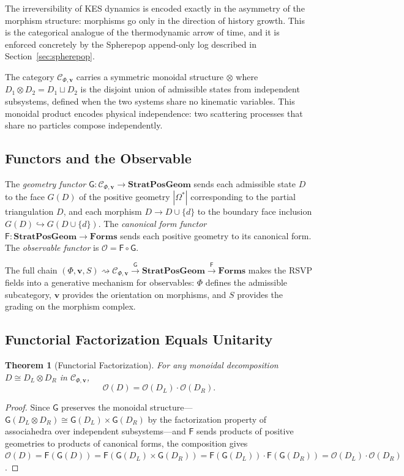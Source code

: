 \documentclass[12pt, oneside]{amsart}
\theoremstyle{plain}
\newtheorem{theorem}{Theorem}[section]
\theoremstyle{definition}
\theoremstyle{remark}
\newcommand{\Phif}{\Phi}
\newcommand{\Sf}{S}
\newcommand{\OmKS}{\Omega}
\newcommand{\SPG}{\mathbf{StratPosGeom}}
\newcommand{\Forms}{\mathbf{Forms}}
\newcommand{\Ccat}{\mathcal{C}_{\Phi,\mathbf{v}}}
\newcommand{\Gfun}{\mathsf{G}}
\newcommand{\Ffun}{\mathsf{F}}
\newcommand{\Ofun}{\mathcal{O}}
\begin{document}
The irreversibility of KES dynamics is encoded exactly in the asymmetry of the morphism structure: morphisms go only in the direction of history growth. This is the categorical analogue of the thermodynamic arrow of time, and it is enforced concretely by the Spherepop append-only log described in Section~\ref{sec:spherepop}.

The category $\Ccat$ carries a symmetric monoidal structure $\otimes$ where $D_1 \otimes D_2 = D_1 \sqcup D_2$ is the disjoint union of admissible states from independent subsystems, defined when the two systems share no kinematic variables. This monoidal product encodes physical independence: two scattering processes that share no particles compose independently.

\subsection{Functors and the Observable}

The \emph{geometry functor} $\Gfun: \Ccat \to \SPG$ sends each admissible state $D$ to the face $G(D)$ of the positive geometry $|\OmKS^*|$ corresponding to the partial triangulation $D$, and each morphism $D \to D \cup \{d\}$ to the boundary face inclusion $G(D) \hookrightarrow G(D \cup \{d\})$. The \emph{canonical form functor} $\Ffun: \SPG \to \Forms$ sends each positive geometry to its canonical form. The \emph{observable functor} is $\Ofun = \Ffun \circ \Gfun$.

The full chain $(\Phif, \mathbf{v}, \Sf) \rightsquigarrow \Ccat \xrightarrow{\Gfun} \SPG \xrightarrow{\Ffun} \Forms$ makes the RSVP fields into a generative mechanism for observables: $\Phif$ defines the admissible subcategory, $\mathbf{v}$ provides the orientation on morphisms, and $\Sf$ provides the grading on the morphism complex.

\subsection{Functorial Factorization Equals Unitarity}

\begin{theorem}[Functorial Factorization]
\label{thm:factorization}
For any monoidal decomposition $D \cong D_L \otimes D_R$ in $\Ccat$,
\[
  \Ofun(D) = \Ofun(D_L) \cdot \Ofun(D_R).
\]
\end{theorem}

\begin{proof}
Since $\Gfun$ preserves the monoidal structure---$\Gfun(D_L \otimes D_R) \cong \Gfun(D_L) \times \Gfun(D_R)$ by the factorization property of associahedra over independent subsystems---and $\Ffun$ sends products of positive geometries to products of canonical forms, the composition gives $\Ofun(D) = \Ffun(\Gfun(D)) = \Ffun(\Gfun(D_L) \times \Gfun(D_R)) = \Ffun(\Gfun(D_L)) \cdot \Ffun(\Gfun(D_R)) = \Ofun(D_L) \cdot \Ofun(D_R)$.
\end{proof}
\end{document}
